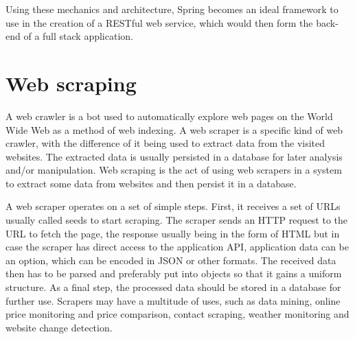 \documentclass[12pt,a4paper,twoside]{report}
\begin{document}
Using these mechanics and architecture, Spring becomes an ideal framework to use in the creation of a RESTful web service, which would then form the back-end of a full stack application.


\section{Web scraping}

A web crawler is a bot used to automatically explore web pages on the World Wide Web as a method of web indexing. A web scraper is a specific kind of web crawler, with the difference of it being used to extract data from the visited websites. The extracted data is usually persisted in a database for later analysis and/or manipulation. Web scraping is the act of using web scrapers in a system to extract some data from websites and then persist it in a database.

A web scraper operates on a set of simple steps. First, it receives a set of URLs usually called seeds to start scraping. The scraper sends an HTTP request to the URL to fetch the page, the response usually being in the form of HTML but in case the scraper has direct access to the application API, application data can be an option, which can be encoded in JSON or other formats. The received data then has to be parsed and preferably put into objects so that it gains a uniform structure. As a final step, the processed data should be stored in a database for further use. Scrapers may have a multitude of uses, such as data mining, online price monitoring and price comparison, contact scraping, weather monitoring and website change detection.
\end{document}
